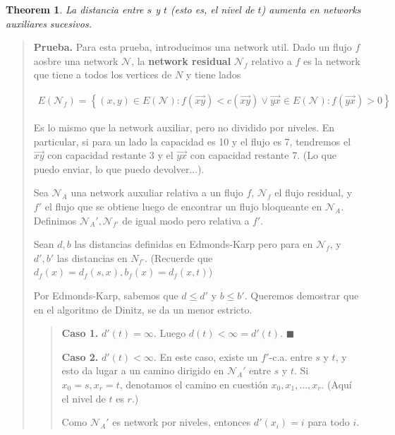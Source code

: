\documentclass[a4paper]{article}
\newtheorem{theorem}{Theorem}
\newtheorem{theorem}{Theorem}
\begin{document}
\begin{theorem}
    La distancia entre $s$ y $t$ (esto es, el nivel de $t$) aumenta en networks
    auxiliares sucesivos.
\end{theorem}

\small
\begin{quote}

\textbf{Prueba.} Para esta prueba, introducimos una network util. Dado un flujo $f$ aosbre una network $\mathcal{N}$,
la \textbf{network residual} $\mathcal{N}_f$ relativo a $f$ es la network que tiene a todos los 
vertices de $N$ y tiene lados 

\begin{align*}
    E(\mathcal{N}_f) = \left\{ (x, y) \in E(\mathcal{N}) :
    f(\overrightarrow{xy}) < c(\overrightarrow{xy}) \lor \overrightarrow{yx}
\in E(\mathcal{N}) : f(\overrightarrow{yx}) > 0\right\} 
\end{align*}

Es lo mismo que la network auxiliar, pero no dividido por niveles. En
particular, si para un lado la capacidad es 10 y el flujo es 7, tendremos el
$\overrightarrow{xy}$ con capacidad restante 3 y el $\overrightarrow{yx}$ con
capacidad restante 7. (Lo que puedo enviar, lo que puedo devolver...).

Sea $\mathcal{N}_A$ una network auxuliar relativa a un flujo $f$, $\mathcal{N}_f$ el flujo 
residual, y $f'$ el flujo que se obtiene luego de encontrar un flujo bloqueante en 
$\mathcal{N}_A$. Definimos $\mathcal{N}_A', \mathcal{N}_{f'}$ de igual modo 
pero relativa a $f'$.

Sean $d, b$ las distancias definidas en Edmonds-Karp pero para en
$\mathcal{N}_f$, y $d', b'$ las distancias en $N_{f'}$. (Recuerde que $d_f(x) =
d_f(s, x), b_f(x) = d_f(x, t)$)

Por Edmonds-Karp, sabemos que $d \leq d'$ y $b \leq b'$. Queremos demostrar que 
en el algoritmo de Dinitz, se da un menor estricto.


\small
\begin{quote}

\textbf{Caso 1.} $d'(t) = \infty$. Luego $d(t) < \infty = d'(t)$. $\blacksquare$

\textbf{Caso 2.} $d'(t) < \infty$. En este caso, existe un $f'$-c.a. entre $s$
y $t$, y esto da lugar a un camino dirigido en $\mathcal{N}_A'$ entre $s$ y
$t$. Si $x_0 = s, x_r = t$, denotamos el camino en cuestión $x_0, x_1, \ldots,
x_r$. (Aquí el nivel de $t$ es $r$.)

Como $\mathcal{N}_A'$ es network por niveles, entonces $d'(x_i) = i$ para todo
$i$. 


\end{quote}
\end{quote}
\end{document}

